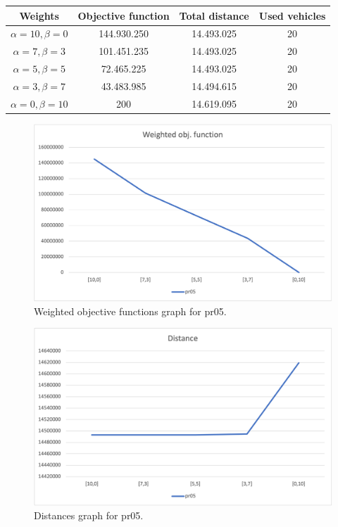 {
\renewcommand{\arraystretch}{2}
\begin{longtable}[h]{| c | c | c | c |}
    \hline
    \textbf{Weights} & \textbf{Objective function} & \textbf{Total distance} & \textbf{Used vehicles} \\
    \hline
    \endhead
    $\alpha = 10, \beta = 0$ & 144.930.250 & 14.493.025 & 20 \\
    \hline
    $\alpha = 7, \beta = 3$  & 101.451.235 & 14.493.025 & 20 \\
    \hline
    $\alpha = 5, \beta = 5$  &  72.465.225 & 14.493.025 & 20 \\
    \hline
    $\alpha = 3, \beta = 7$  &  43.483.985 & 14.494.615 & 20 \\
    \hline
    $\alpha = 0, \beta = 10$ &         200 & 14.619.095 & 20 \\
    \hline
\end{longtable}
}
\begin{figure}[H]
    \centering
    \includegraphics[height=0.25\textheight]{../graphs/pr05-wobjf.png}
    \caption{Weighted objective functions graph for pr05.}
\end{figure}

\begin{figure}[H]
    \centering
    \includegraphics[height=0.25\textheight]{../graphs/pr05-distance.png}
    \caption{Distances graph for pr05.}
\end{figure}

